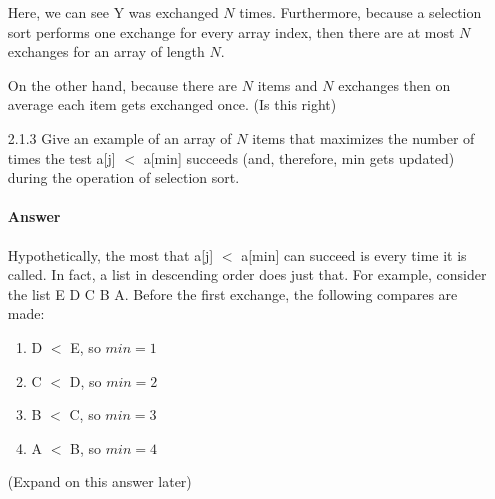 \documentclass[]{article}
\begin{document}
\begin{enumerate}
	Here, we can see Y was exchanged $N$ times. Furthermore, because a selection sort performs one exchange for every array index, then there are at most $N$ exchanges for an array of length $N$.
	
	\bigskip
	
	On the other hand, because there are $N$ items and $N$ exchanges then on average each item gets exchanged once. (Is this right)
	
	\item[2.1.3] Give an example of an array of $N$ items that maximizes the number of times the test a[j] $<$ a[min] succeeds (and, therefore, min gets updated) during the operation of selection sort.
	
	\paragraph{Answer} Hypothetically, the most that a[j] $<$ a[min] can succeed is every time it is called. In fact, a list in descending order does just that. For example, consider the list E D C B A. Before the first exchange, the following compares are made:
		\begin{enumerate}
			\item D $<$ E, so $min = 1$
			\item C $<$ D, so $min = 2$
			\item B $<$ C, so $min = 3$
			\item A $<$ B, so $min = 4$
		\end{enumerate}
		
	(Expand on this answer later)
\end{enumerate}
\end{document}
